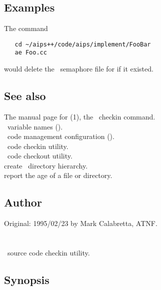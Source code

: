 \subsection*{Examples}

The command

\begin{verbatim}
   cd ~/aips++/code/aips/implement/FooBar
   ae Foo.cc
\end{verbatim}

\noindent
would delete the \rcs\ semaphore file for  if it existed.

\subsection*{See also}

The manual page for (1), the \rcs\ checkin command.\\
\aipspp\ variable names ().\\
\aipspp\ code management configuration ().\\
 \aipspp\ code checkin utility.\\
 \aipspp\ code checkout utility.\\
 create \aipspp\ directory hierarchy.\\
 report the age of a file or directory.

\subsection*{Author}

Original: 1995/02/23 by Mark Calabretta, ATNF.


\newpage
\section{}
\label{ai}

\aipspp\ source code checkin utility.

\subsection*{Synopsis}


